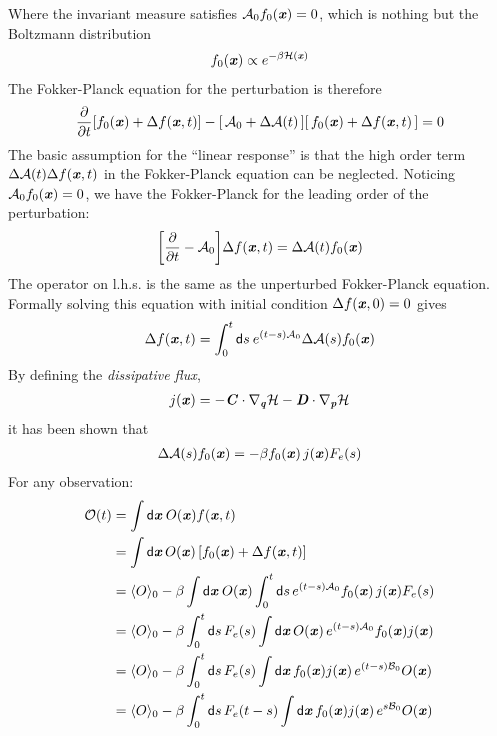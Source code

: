 \documentclass[aip,jcp,a4paper,reprint,onecolumn]{revtex4-1}
\newcommand{\vect}[1]{\textbf{\textit{#1}}}
\newcommand{\dd}{\textsf{d}}
\newcommand{\mh}{\mathcal H}
\newcommand{\fwg}{{\mathcal A}}
\newcommand{\bwg}{{\mathcal B}}
\begin{document}
Where the invariant measure satisfies $\fwg_0f_0(\vect x) = 0$,
which is nothing but the Boltzmann distribution
\begin{align}
  f_0(\vect x) \propto e^{-\beta\mh(\vect x)}
\end{align}
The Fokker-Planck equation for the perturbation is therefore
\begin{align}
  \frac{\partial}{\partial t}
  [f_0(\vect x) + \Delta  f(\vect x, t)]
  -
  [\,\fwg_0 + \Delta\fwg(t)\,]
  [\,f_0(\vect x) + \Delta  f(\vect x, t)\,] = 0
\end{align}
The basic assumption for the ``linear response'' is that the high order
term $\Delta\fwg(t)  \Delta  f(\vect x, t)$ in the Fokker-Planck equation
can be neglected. Noticing $\fwg_0 f_0(\vect x) = 0$, we have the
Fokker-Planck
for the leading order of the perturbation:
\begin{align}
  \bigg[
  \frac{\partial}{\partial t}
  - \fwg_0
  \bigg]
  \Delta  f(\vect x, t)
  =
  \Delta\fwg(t) f_0(\vect x)
\end{align}
The operator on l.h.s. is the same as the unperturbed Fokker-Planck equation.
Formally solving this equation with initial condition
$\Delta f(\vect x, 0) = 0$ gives
\begin{align}
  \Delta  f(\vect x, t) =
  \int_0^t \dd s \:
  e^{(t-s)\fwg_0}
  \Delta\fwg(s)f_0(\vect x)
\end{align}
By defining the \emph{dissipative flux},
\begin{align}
  j(\vect x) =
  -\vect C\cdot\nabla_{\vect q}\mh 
  -\vect D\cdot\nabla_{\vect p}\mh
\end{align}
it has been shown that~\cite{tuckeman2010statistical}
\begin{align}
  \Delta\fwg(s)f_0(\vect x) =
  -\beta f_0(\vect x)\, j(\vect x) F_e(s)
\end{align}
For any observation:
\begin{align}\nonumber
  \mathcal O(t)
  &=
  \int\dd \vect x \:O(\vect x)f(\vect x, t)  \\\nonumber
  &=
  \int\dd \vect x\, O(\vect x)\,
  [f_0(\vect x) + \Delta f(\vect x, t)] \\\nonumber
  &=
  \langle O\rangle_0
  -
  \beta
  \int \dd \vect x\:
  O(\vect x)
  \int_0^t\dd s\,
  e^{(t-s)\fwg_0}
  f_0(\vect x)\, j(\vect x)F_e(s)  \\\nonumber
  &=
  \langle O\rangle_0
  -
  \beta
  \int_0^t\dd s\,
  F_e(s)
  \int \dd \vect x\,
  O(\vect x)\,
  e^{(t-s)\fwg_0}
  f_0(\vect x) j(\vect x)  \\
  &=
  \langle O\rangle_0
  -
  \beta
  \int_0^t\dd s\,
  F_e(s)
  \int \dd \vect x\,
  f_0(\vect x) j(\vect x)\,
  e^{(t-s)\bwg_0}
  O(\vect x)\\
  &=
  \langle O\rangle_0
  -
  \beta
  \int_0^t\dd s\,
  F_e(t-s)
  \int \dd \vect x\,
  f_0(\vect x) j(\vect x)\,
  e^{s\bwg_0}
  O(\vect x)
\end{align}
\end{document}
